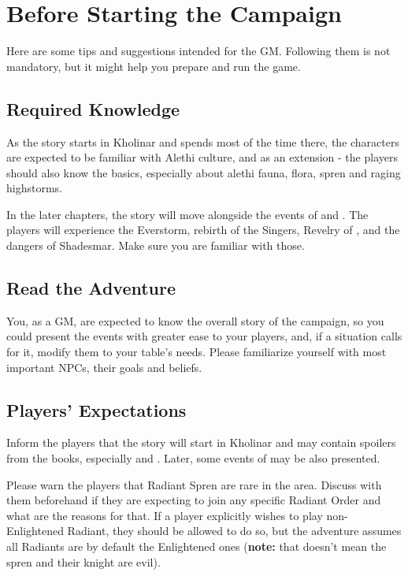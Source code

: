 \section{Before Starting the Campaign}

Here are some tips and suggestions intended for the GM. Following them is not mandatory, but it might help you prepare and run the game.

\subsection{Required Knowledge}

As the story starts in Kholinar and spends most of the time there, the characters are expected to be familiar with Alethi culture, and as an extension - the players should also know the basics, especially about alethi fauna, flora, spren and raging highstorms.

In the later chapters, the story will move alongside the events of \bookWOR{} and \bookOB{}. The players will experience the Everstorm, rebirth of the Singers, Revelry of \npcHeartRevel{}, and the dangers of Shadesmar. Make sure you are familiar with those.

\subsection{Read the Adventure}

You, as a GM, are expected to know the overall story of the campaign, so you could present the events with greater ease to your players, and, if a situation calls for it, modify them to your table's needs. Please familiarize yourself with most important NPCs, their goals and beliefs.

\subsection{Players’ Expectations}
\label{ssec:playersExpectations}

Inform the players that the story will start in Kholinar and may contain spoilers from the books, especially \bookWOR{} and \bookOB{}. Later, some events of \bookWAT{} may be also presented. 

Please warn the players that Radiant Spren are rare in the area. Discuss with them beforehand if they are expecting to join any specific Radiant Order and what are the reasons for that. If a player explicitly wishes to play non-Enlightened Radiant, they should be allowed to do so, but the adventure assumes all Radiants are by default the Enlightened ones (\textbf{note:} that doesn't mean the spren and their knight are evil). 

